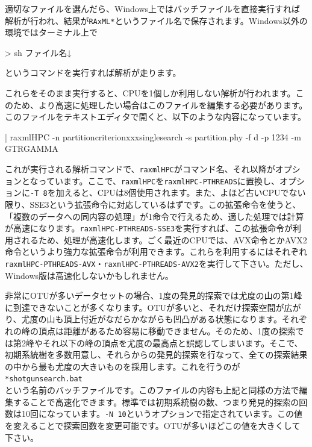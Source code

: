 \documentclass[titlepage,10pt,a4paper]{jsbook}
\newenvironment{content}{\begin{shaded}\vspace{-1em}\raggedright\ttfamily\footnotesize\setlength{\baselineskip}{1.4em}}{\end{shaded}\vspace{-1em}}
\newenvironment{cmd}{\begin{oframed}\raggedright\ttfamily\footnotesize\setlength{\baselineskip}{1.4em}}{\end{oframed}\vspace{-1em}}
\begin{document}
適切なファイルを選んだら、Windows上ではバッチファイルを直接実行すれば解析が行われ、結果が\texttt{RAxML{\textunderscore}*}というファイル名で保存されます。Windows以外の環境ではターミナル上で
\begin{cmd}
{\textgreater} sh ファイル名↓
\end{cmd}
というコマンドを実行すれば解析が走ります。

これらをそのまま実行すると、CPUを1個しか利用しない解析が行われます。このため、より高速に処理したい場合はこのファイルを編集する必要があります。このファイルをテキストエディタで開くと、以下のような内容になっています。
\begin{content}
| raxmlHPC -n partition{\textunderscore}criterion{\textunderscore}xxx{\textunderscore}singlesearch -s partition.phy -f d -p 1234 -m GTRGAMMA
\end{content}
これが実行される解析コマンドで、\texttt{raxmlHPC}がコマンド名、それ以降がオプションとなっています。ここで、\texttt{raxmlHPC}を\texttt{raxmlHPC-PTHREADS}に置換し、オプションに\texttt{-T 8}を加えると、CPUは8個使用されます。また、よほど古いCPUでない限り、SSE3という拡張命令に対応しているはずです。この拡張命令を使うと、「複数のデータへの同内容の処理」が1命令で行えるため、適した処理では計算が高速になります。\texttt{raxmlHPC-PTHREADS-SSE3}を実行すれば、この拡張命令が利用されるため、処理が高速化します。ごく最近のCPUでは、AVX命令とかAVX2命令というより強力な拡張命令が利用できます。これらを利用するにはそれぞれ\texttt{raxmlHPC-PTHREADS-AVX}・\texttt{raxmlHPC-PTHREADS-AVX2}を実行して下さい。ただし、Windows版は高速化しないかもしれません。

非常にOTUが多いデータセットの場合、1度の発見的探索では尤度の山の第1峰に到達できないことが多くなります。OTUが多いと、それだけ探索空間が広がり、尤度の山も頂上付近がなだらかながらも凹凸がある状態になります。それぞれの峰の頂点は距離があるため容易に移動できません。そのため、1度の探索では第2峰やそれ以下の峰の頂点を尤度の最高点と誤認してしまいます。そこで、初期系統樹を多数用意し、それらからの発見的探索を行なって、全ての探索結果の中から最も尤度の大きいものを採用します。これを行うのが\\
\texttt{*{\textunderscore}shotgunsearch.bat}\\
という名前のバッチファイルです。このファイルの内容も上記と同様の方法で編集することで高速化できます。標準では初期系統樹の数、つまり発見的探索の回数は10回になっています。\texttt{-N 10}というオプションで指定されています。この値を変えることで探索回数を変更可能です。OTUが多いほどこの値を大きくして下さい。
\end{document}
